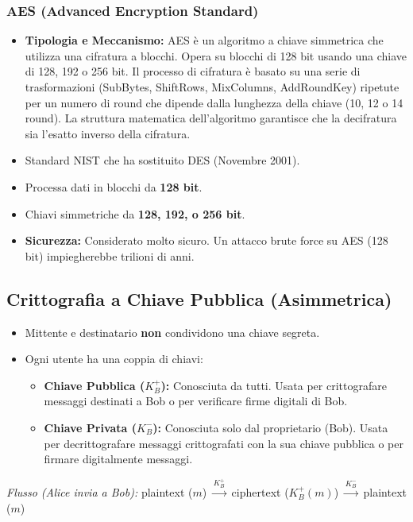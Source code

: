 \subsubsection{AES (Advanced Encryption Standard)}
\begin{itemize}
    \item \textbf{Tipologia e Meccanismo:} AES è un algoritmo a chiave simmetrica che utilizza una cifratura a blocchi. Opera su blocchi di 128 bit usando una chiave di 128, 192 o 256 bit. Il processo di cifratura è basato su una serie di trasformazioni (SubBytes, ShiftRows, MixColumns, AddRoundKey) ripetute per un numero di round che dipende dalla lunghezza della chiave (10, 12 o 14 round). La struttura matematica dell'algoritmo garantisce che la decifratura sia l'esatto inverso della cifratura.
    \item Standard NIST che ha sostituito DES (Novembre 2001).
    \item Processa dati in blocchi da \textbf{128 bit}.
    \item Chiavi simmetriche da \textbf{128, 192, o 256 bit}.
    \item \textbf{Sicurezza:} Considerato molto sicuro. Un attacco brute force su AES (128 bit) impiegherebbe trilioni di anni.
\end{itemize}

\subsection{Crittografia a Chiave Pubblica (Asimmetrica)}
\begin{itemize}
    \item Mittente e destinatario \textbf{non} condividono una chiave segreta.
    \item Ogni utente ha una coppia di chiavi:
    \begin{itemize}
        \item \textbf{Chiave Pubblica ($K_B^+$):} Conosciuta da tutti. Usata per crittografare messaggi destinati a Bob o per verificare firme digitali di Bob.
        \item \textbf{Chiave Privata ($K_B^-$):} Conosciuta solo dal proprietario (Bob). Usata per decrittografare messaggi crittografati con la sua chiave pubblica o per firmare digitalmente messaggi.
    \end{itemize}
\end{itemize}
\textit{Flusso (Alice invia a Bob):} plaintext ($m$) $\xrightarrow{K_B^+}$ ciphertext ($K_B^+(m)$) $\xrightarrow{K_B^-}$ plaintext ($m$)

